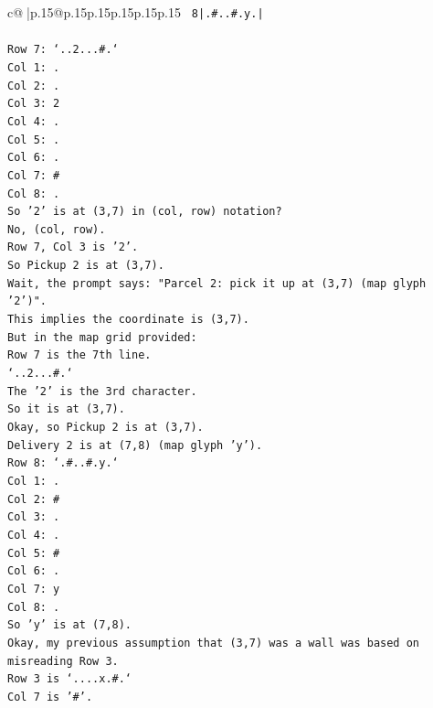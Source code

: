 \documentclass{article}
\begin{document}
{\begin{supertabular}{c@{$\;$}|p{.15\linewidth}@{}p{.15\linewidth}p{.15\linewidth}p{.15\linewidth}p{.15\linewidth}p{.15\linewidth}}
{{{\texttt{ 8|.\#..\#.y.|} \\
\\ 
\texttt{Row 7: `..2...\#.`} \\
\texttt{Col 1: .} \\
\texttt{Col 2: .} \\
\texttt{Col 3: 2} \\
\texttt{Col 4: .} \\
\texttt{Col 5: .} \\
\texttt{Col 6: .} \\
\texttt{Col 7: \#} \\
\texttt{Col 8: .} \\
\texttt{So '2' is at (3,7) in (col, row) notation?} \\
\texttt{No, (col, row).} \\
\texttt{Row 7, Col 3 is '2'.} \\
\texttt{So Pickup 2 is at (3,7).} \\
\texttt{Wait, the prompt says: "Parcel 2: pick it up at (3,7) (map glyph '2')".} \\
\texttt{This implies the coordinate is (3,7).} \\
\texttt{But in the map grid provided:} \\
\texttt{Row 7 is the 7th line.} \\
\texttt{`..2...\#.`} \\
\texttt{The '2' is the 3rd character.} \\
\texttt{So it is at (3,7).} \\
\texttt{Okay, so Pickup 2 is at (3,7).} \\
\texttt{Delivery 2 is at (7,8) (map glyph 'y').} \\
\texttt{Row 8: `.\#..\#.y.`} \\
\texttt{Col 1: .} \\
\texttt{Col 2: \#} \\
\texttt{Col 3: .} \\
\texttt{Col 4: .} \\
\texttt{Col 5: \#} \\
\texttt{Col 6: .} \\
\texttt{Col 7: y} \\
\texttt{Col 8: .} \\
\texttt{So 'y' is at (7,8).} \\
\texttt{Okay, my previous assumption that (3,7) was a wall was based on misreading Row 3.} \\
\texttt{Row 3 is `....x.\#.`} \\
\texttt{Col 7 is '\#'.} \\
}}}
\end{supertabular}}
\end{document}
